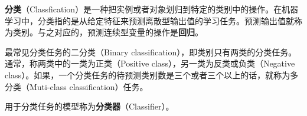 
\textbf{分类}（Classfication）是一种把实例或者对象划归到特定的类别中的操作。在机器学习中，分类指的是从给定特征来预测离散型输出值的学习任务。预测输出值就称为类别。与之对应的，预测连续型变量的操作是\textbf{回归}。

最常见分类任务的二分类（Binary classification），即类别只有两类的分类任务。通常，称两类中的一类为正类（Positive class），另一类为反类或负类（Negative class）。如果，一个分类任务的待预测类别数是三个或者三个以上的话，就称为多分类（Muti-class classification）任务。

用于分类任务的模型称为\textbf{分类器}（Classifier）。